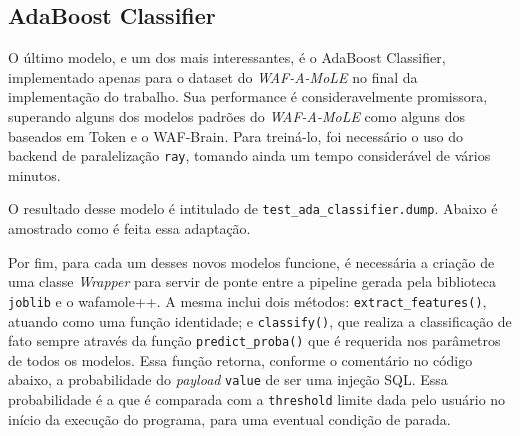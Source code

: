 \label{sec:codigos:modelos}
\bigskip

\subsection{AdaBoost Classifier}

O último modelo, e um dos mais interessantes, é o AdaBoost Classifier, implementado apenas para o dataset do \textit{WAF-A-MoLE} no final da implementação do trabalho. Sua performance é consideravelmente promissora, superando alguns dos modelos padrões do \textit{WAF-A-MoLE} como alguns dos baseados em Token e o WAF-Brain. Para treiná-lo, foi necessário o uso do backend de paralelização \verb+ray+, tomando ainda um tempo considerável de vários minutos.

O resultado desse modelo é intitulado de \verb+test_ada_classifier.dump+. Abaixo é amostrado como é feita essa adaptação.

\label{sec:codigos:modelos}
\bigskip

Por fim, para cada um desses novos modelos funcione, é necessária a criação de uma classe \textit{Wrapper} para servir de ponte entre a pipeline gerada pela biblioteca \verb+joblib+ e o wafamole++. A mesma inclui dois métodos: \verb+extract_features()+, atuando como uma função identidade; e \verb+classify()+, que realiza a classificação de fato sempre através da função \verb+predict_proba()+ que é requerida nos parâmetros de todos os modelos. Essa função retorna, conforme o comentário no código abaixo, a probabilidade do \textit{payload} \verb+value+ de ser uma injeção SQL. Essa probabilidade é a que é comparada com a \verb+threshold+ limite dada pelo usuário no início da execução do programa, para uma eventual condição de parada.

\label{sec:codigos:modelos}
\bigskip




